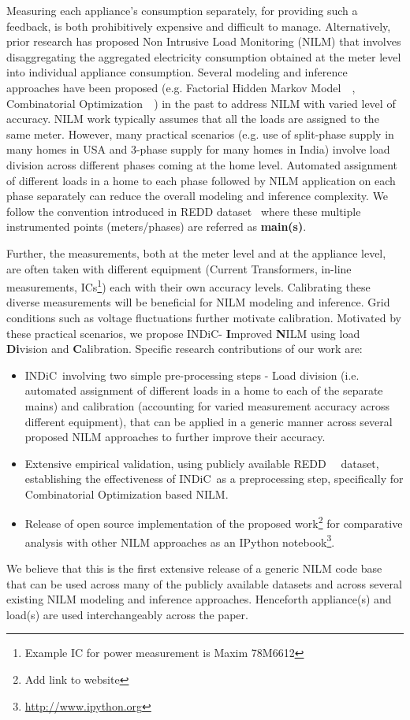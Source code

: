 \documentclass[conference]{IEEEtran}
\newcommand{\indic}{INDiC~}
\newcommand{\indicns}{INDiC}
\begin{document}
\noindent Measuring each appliance's consumption separately, for providing such a feedback, is both prohibitively expensive and difficult to manage. Alternatively, prior research has proposed Non Intrusive Load Monitoring (NILM) that involves disaggregating the aggregated electricity consumption obtained at the meter level into individual appliance consumption. Several modeling and inference approaches have been proposed (e.g. Factorial Hidden Markov Model~~\cite{Ghahramani_97a}, Combinatorial Optimization~~\cite{hart}) in the past to address NILM with varied level of accuracy. NILM work typically assumes that all the loads are assigned to the same meter. However, many practical scenarios (e.g. use of split-phase supply in many homes in USA and 3-phase supply for many homes in India) involve load division across different phases coming at the home level. Automated assignment of different loads in a home to each phase followed by NILM application on each phase separately can reduce the overall modeling and inference complexity. We follow the convention introduced in REDD dataset~\cite{redd} where these multiple instrumented points (meters/phases) are referred as \textbf{main(s)}.

\noindent Further, the measurements, both at the meter level and at the appliance level, are often taken with different equipment (Current Transformers, in-line measurements, ICs\footnote{Example IC for power measurement is Maxim 78M6612}) each with their own accuracy levels. Calibrating these diverse measurements will be beneficial for NILM modeling and inference. Grid conditions such as voltage fluctuations further motivate calibration. Motivated by these practical scenarios, we propose \indicns - \textbf{I}mproved \textbf{N}ILM using load \textbf{Di}vision and \textbf{C}alibration. Specific research contributions of our work are:
\begin{itemize}
\item \indic involving two simple pre-processing steps - Load division (i.e. automated assignment of different loads in a home to each of the separate mains) and calibration (accounting for varied measurement accuracy across different equipment), that can be applied in a generic manner across several proposed NILM approaches to further improve their accuracy. 
\item Extensive empirical validation, using publicly available REDD~~\cite{redd} dataset, establishing the effectiveness of \indic as a preprocessing step, specifically for Combinatorial Optimization based NILM. 
\item Release of open source implementation of the proposed work\footnote{Add link to website} for comparative analysis with other NILM approaches as an IPython notebook\footnote{\url{http://www.ipython.org}}. 
\end{itemize}
\noindent We believe that this is the first extensive release of a generic NILM code base that can be used across many of the publicly available datasets and across several existing NILM modeling and inference approaches. Henceforth appliance(s) and load(s) are used interchangeably across the paper.
\end{document}
